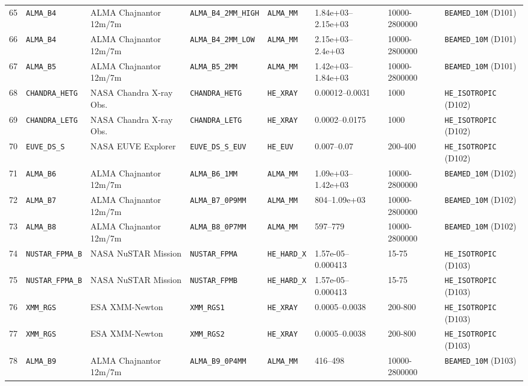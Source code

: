 \documentclass[twocolumn,10pt]{article}
\begin{document}
\begin{table}[!ht]
{\begin{tabular}{rlllllll}
65 & \texttt{ALMA\_B4} & ALMA Chajnantor 12m/7m & \texttt{ALMA\_B4\_2MM\_HIGH} & \texttt{ALMA\_MM} & 1.84e+03--2.15e+03 & 10000-2800000 & \texttt{BEAMED\_10M} (D101) \\
66 & \texttt{ALMA\_B4} & ALMA Chajnantor 12m/7m & \texttt{ALMA\_B4\_2MM\_LOW} & \texttt{ALMA\_MM} & 2.15e+03--2.4e+03 & 10000-2800000 & \texttt{BEAMED\_10M} (D101) \\
67 & \texttt{ALMA\_B5} & ALMA Chajnantor 12m/7m & \texttt{ALMA\_B5\_2MM} & \texttt{ALMA\_MM} & 1.42e+03--1.84e+03 & 10000-2800000 & \texttt{BEAMED\_10M} (D101) \\
68 & \texttt{CHANDRA\_HETG} & NASA Chandra X-ray Obs. & \texttt{CHANDRA\_HETG} & \texttt{HE\_XRAY} & 0.00012--0.0031 & 1000 & \texttt{HE\_ISOTROPIC} (D102) \\
69 & \texttt{CHANDRA\_LETG} & NASA Chandra X-ray Obs. & \texttt{CHANDRA\_LETG} & \texttt{HE\_XRAY} & 0.0002--0.0175 & 1000 & \texttt{HE\_ISOTROPIC} (D102) \\
70 & \texttt{EUVE\_DS\_S} & NASA EUVE Explorer & \texttt{EUVE\_DS\_S\_EUV} & \texttt{HE\_EUV} & 0.007--0.07 & 200-400 & \texttt{HE\_ISOTROPIC} (D102) \\
71 & \texttt{ALMA\_B6} & ALMA Chajnantor 12m/7m & \texttt{ALMA\_B6\_1MM} & \texttt{ALMA\_MM} & 1.09e+03--1.42e+03 & 10000-2800000 & \texttt{BEAMED\_10M} (D102) \\
72 & \texttt{ALMA\_B7} & ALMA Chajnantor 12m/7m & \texttt{ALMA\_B7\_0P9MM} & \texttt{ALMA\_MM} & 804--1.09e+03 & 10000-2800000 & \texttt{BEAMED\_10M} (D102) \\
73 & \texttt{ALMA\_B8} & ALMA Chajnantor 12m/7m & \texttt{ALMA\_B8\_0P7MM} & \texttt{ALMA\_MM} & 597--779 & 10000-2800000 & \texttt{BEAMED\_10M} (D102) \\
74 & \texttt{NUSTAR\_FPMA\_B} & NASA NuSTAR Mission & \texttt{NUSTAR\_FPMA} & \texttt{HE\_HARD\_X} & 1.57e-05--0.000413 & 15-75 & \texttt{HE\_ISOTROPIC} (D103) \\
75 & \texttt{NUSTAR\_FPMA\_B} & NASA NuSTAR Mission & \texttt{NUSTAR\_FPMB} & \texttt{HE\_HARD\_X} & 1.57e-05--0.000413 & 15-75 & \texttt{HE\_ISOTROPIC} (D103) \\
76 & \texttt{XMM\_RGS} & ESA XMM-Newton & \texttt{XMM\_RGS1} & \texttt{HE\_XRAY} & 0.0005--0.0038 & 200-800 & \texttt{HE\_ISOTROPIC} (D103) \\
77 & \texttt{XMM\_RGS} & ESA XMM-Newton & \texttt{XMM\_RGS2} & \texttt{HE\_XRAY} & 0.0005--0.0038 & 200-800 & \texttt{HE\_ISOTROPIC} (D103) \\
78 & \texttt{ALMA\_B9} & ALMA Chajnantor 12m/7m & \texttt{ALMA\_B9\_0P4MM} & \texttt{ALMA\_MM} & 416--498 & 10000-2800000 & \texttt{BEAMED\_10M} (D103) \\

\end{tabular}}
\end{table}
\end{document}

